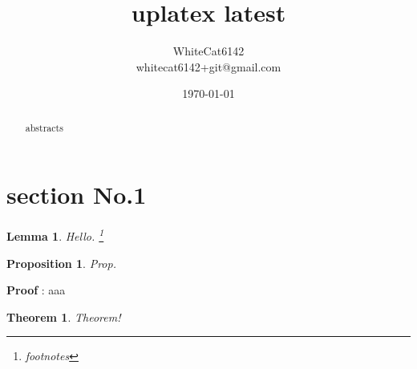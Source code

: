 \documentclass[uplatex,dvipdfmx,12pt,a4j]{jsarticle}
\newtheorem*{Lemma}{Lemma}
\newtheorem{Theorem}{Theorem}
\newtheorem{Proposition}{Proposition}
\begin{document}
\title{uplatex latest}
\author{WhiteCat6142 \\whitecat6142+git@gmail.com}
\date{\today}
\maketitle

\begin{abstract}
abstracts
\end{abstract}

\section{section No.1} 

\begin{Lemma}
Hello. \footnote{footnotes}
\end{Lemma}

\begin{Proposition}
Prop.
\autocite{einstein}
\end{Proposition}

\textbf{Proof}  :
aaa

\begin{Theorem}
Theorem!
\end{Theorem}

\printbibliography[title={Bibliography}]
\end{document}
